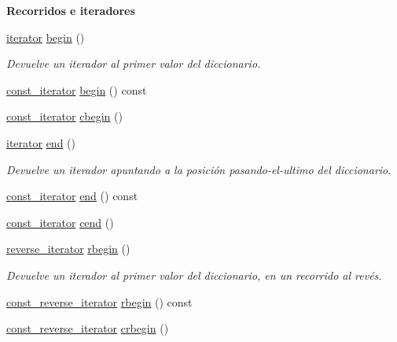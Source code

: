 \begin{Indent}\textbf{ Recorridos e iteradores}\par
\begin{DoxyCompactItemize}
\item 
\hyperlink{classaed2_1_1map_1_1iterator}{iterator} \hyperlink{classaed2_1_1map_a58a95705d54b3dda7f775ce5a22225cb}{begin} ()
\begin{DoxyCompactList}\small\item\em Devuelve un iterador al primer valor del diccionario. \end{DoxyCompactList}\item 
\hyperlink{classaed2_1_1map_1_1const__iterator}{const\+\_\+iterator} \hyperlink{classaed2_1_1map_af3b1818c2b44e37221cc3b131768555b}{begin} () const
\item 
\hyperlink{classaed2_1_1map_1_1const__iterator}{const\+\_\+iterator} \hyperlink{classaed2_1_1map_ab96ad892caa28f193481a578f4956a2a}{cbegin} ()
\item 
\hyperlink{classaed2_1_1map_1_1iterator}{iterator} \hyperlink{classaed2_1_1map_a76023e6a56cb625513e1b5ea028bf983}{end} ()
\begin{DoxyCompactList}\small\item\em Devuelve un iterador apuntando a la posición pasando-\/el-\/ultimo del diccionario. \end{DoxyCompactList}\item 
\hyperlink{classaed2_1_1map_1_1const__iterator}{const\+\_\+iterator} \hyperlink{classaed2_1_1map_a91e7cad1a638c55659c169d5574cd5d7}{end} () const
\item 
\hyperlink{classaed2_1_1map_1_1const__iterator}{const\+\_\+iterator} \hyperlink{classaed2_1_1map_a7bb91e94cbc875f1a011b142ef877912}{cend} ()
\item 
\hyperlink{classaed2_1_1map_a8e6a592062260177fd73b2f9897b1dd5}{reverse\+\_\+iterator} \hyperlink{classaed2_1_1map_ac412d3902112122c1bffe2d4283a4e9d}{rbegin} ()
\begin{DoxyCompactList}\small\item\em Devuelve un iterador al primer valor del diccionario, en un recorrido al revés. \end{DoxyCompactList}\item 
\hyperlink{classaed2_1_1map_aed66a216549d13078a3ea6978ea0b768}{const\+\_\+reverse\+\_\+iterator} \hyperlink{classaed2_1_1map_a71ab53ab04f5e35a189c6576fddeb483}{rbegin} () const
\item 
\hyperlink{classaed2_1_1map_aed66a216549d13078a3ea6978ea0b768}{const\+\_\+reverse\+\_\+iterator} \hyperlink{classaed2_1_1map_a6ad62765a2b2e00247b9e35a7542b448}{crbegin} ()

\end{DoxyCompactItemize}
\end{Indent}
